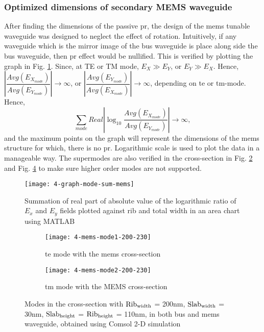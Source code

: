 \documentclass[../report.tex]{subfiles}
\begin{document}
\subsubsection{Optimized dimensions of secondary MEMS waveguide}
After finding the dimensions of the passive \gls{pr}, the design of the \gls{mems} tunable waveguide was designed to neglect the effect of rotation. Intuitively, if any waveguide which is the mirror image of the bus waveguide is place along side the bus waveguide, then \gls{pr} effect would be nullified. This is verified by plotting the graph in Fig. \ref{fig:4_graph_mode_sum_mems}. Since, at TE or TM mode, $E_X \gg E_Y$, or $E_Y \gg E_X$. Hence, $\left|\dfrac {Avg(E_{X_{mode}})} {Avg(E_{Y_{mode}})}\right| \rightarrow \infty$, or $\left|\dfrac {Avg(E_{Y_{mode}})} {Avg(E_{X_{mode}})}\right| \rightarrow \infty$, depending on \gls{te} or \gls{tm}-mode.
Hence, 
\begin{equation}\label{eq:mems_dim_eq}
\sum _{mode}Real\left| \log _{10}\dfrac {Avg(E_{X_{mode}})} {Avg(E_{Y_{mode}})}\right| \rightarrow \infty,
\end{equation}
and the maximum points on the graph will represent the dimensions of the \gls{mems} structure for which, there is no \gls{pr}. Logarithmic scale is used to plot the data in a manageable way. The supermodes are also verified in the cross-section in Fig. \ref{fig:4_mems_mode1_200_230} and Fig. \ref{fig:4_mems_mode2_200_230} to make sure higher order modes are not supported.

\begin{figure}[H] %
	\centering
	\texttt{[image: 4-graph-mode-sum-mems]}
	\caption{Summation of real part of absolute value of the logarithmic ratio of $E_x$ and $E_y$ fields plotted against rib and total width in an area chart using MATLAB}
	\label{fig:4_graph_mode_sum_mems}
\end{figure}
		
\begin{figure}[H] %
	\begin{subfigure}[t]{0.45\textwidth}
		\texttt{[image: 4-mems-mode1-200-230]}
		\caption{\gls{te} mode with the \gls{mems} cross-section}
		\label{fig:4_mems_mode1_200_230}
	\end{subfigure}
	\hfill
	\begin{subfigure}[t]{0.45\textwidth}
		\texttt{[image: 4-mems-mode2-200-230]}
		\caption{\gls{tm} mode with the MEMS cross-section}
		\label{fig:4_mems_mode2_200_230}
	\end{subfigure}
	\caption{Modes in the cross-section with $\mathrm{Rib_{width}}$ = 200nm, $\mathrm{Slab_{width}}$ = 30nm, $\mathrm{Slab_{height}}$ = $\mathrm{Rib_{height}}$ = 110nm, in both bus and \gls{mems} waveguide, obtained using Comsol 2-D simulation}
\end{figure}
\end{document}
